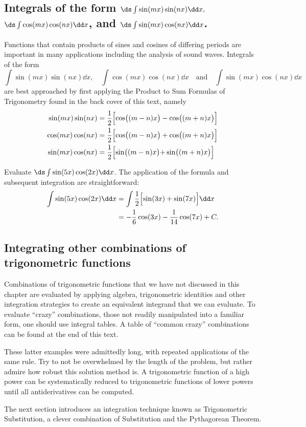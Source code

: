 \subsection{Integrals of the form \texorpdfstring{$\ds \int\sin(mx)\sin(nx)\dd x,$ $\ds\int \cos(mx)\cos(nx)\dd x$, and $\ds\int \sin(mx)\cos(nx)\dd x$.}{∫sin(mx)sin(nx)dx, ∫cos(mx)cos(nx)dx, and ∫sin(mx)cos(nx)dx}}

Functions that contain products of sines and cosines of differing periods are important in many applications including the analysis of sound waves. Integrals of the form 
\[
\int\sin(mx)\sin(nx)\dd x,\quad \int \cos(mx)\cos(nx)\dd x \quad \text{and}\quad\int \sin(mx)\cos(nx)\dd x
\]
are best approached by first applying the Product to Sum Formulas of Trigonometry found in the back cover of this text, namely
\begin{align*}
\sin(mx)\sin(nx) &= \frac12\Bigl[\cos\bigl((m-n)x\bigr)-\cos\bigl((m+n)x\bigr)\Bigr] \\
\cos(mx)\cos(nx) &= \frac12\Bigl[\cos\bigl((m-n)x\bigr)+\cos\bigl((m+n)x\bigr)\Bigr] \\
\sin(mx)\cos(nx) &=	\frac12\Bigl[\sin\bigl((m-n)x\bigl)+\sin\bigl((m+n)x\bigr)\Bigr]
\end{align*}

\begin{example}\label{ex_trigint4}%
Evaluate $\ds\int\sin(5x)\cos(2x)\dd x$.
\solution
The application of the formula and subsequent integration are straightforward:
\begin{align*}
	\int\sin(5x)\cos(2x)\dd x
	&= \int \frac12\Bigl[\sin(3x)+\sin(7x)\Bigr]\dd x \\
	&= -\frac16\cos(3x) - \frac1{14}\cos(7x) + C.
\end{align*}
\end{example}

\subsection{Integrating other combinations of trigonometric functions}

Combinations of trigonometric functions that we have not discussed in this chapter are evaluated by applying algebra, trigonometric identities and other integration strategies to create an equivalent integrand that we can evaluate. To evaluate ``crazy'' combinations, those not readily manipulated into a familiar form, one should use integral tables. A table of ``common crazy'' combinations can be found at the end of this text.

These latter examples were admittedly long, with repeated applications of the same rule. Try to not be overwhelmed by the length of the problem, but rather admire how robust this solution method is. A trigonometric function of a high power can be systematically reduced to trigonometric functions of lower powers until all antiderivatives can be computed. 

The next section introduces an integration technique known as Trigonometric Substitution, a clever combination of Substitution and the Pythagorean Theorem.

